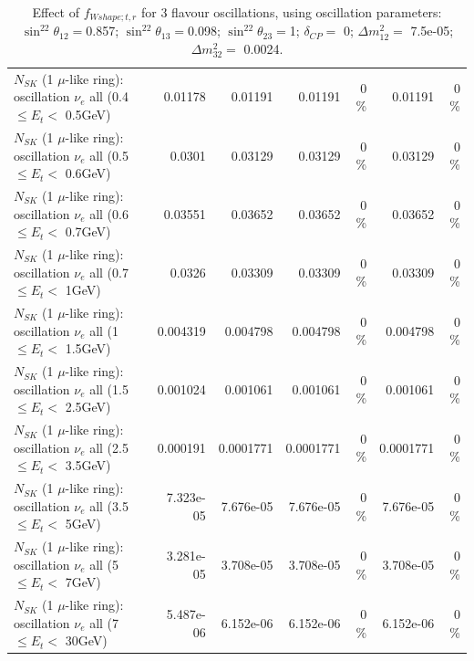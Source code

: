 \begin{table}
\begin{tabular}{| l | r | r | r  r | r  r |}
$N_{SK}$ (1 $\mu$-like ring): oscillation $\nu_{e}$ all (0.4 $\leq E_{t} <$ 0.5GeV) &         0.01178 &         0.01191 &         0.01191 &        0 \%  &         0.01191 &        0 \%  \\ 
$N_{SK}$ (1 $\mu$-like ring): oscillation $\nu_{e}$ all (0.5 $\leq E_{t} <$ 0.6GeV) &          0.0301 &         0.03129 &         0.03129 &        0 \%  &         0.03129 &        0 \%  \\ 
$N_{SK}$ (1 $\mu$-like ring): oscillation $\nu_{e}$ all (0.6 $\leq E_{t} <$ 0.7GeV) &         0.03551 &         0.03652 &         0.03652 &        0 \%  &         0.03652 &        0 \%  \\ 
$N_{SK}$ (1 $\mu$-like ring): oscillation $\nu_{e}$ all (0.7 $\leq E_{t} <$ 1GeV) &          0.0326 &         0.03309 &         0.03309 &        0 \%  &         0.03309 &        0 \%  \\ 
$N_{SK}$ (1 $\mu$-like ring): oscillation $\nu_{e}$ all (1 $\leq E_{t} <$ 1.5GeV) &        0.004319 &        0.004798 &        0.004798 &        0 \%  &        0.004798 &        0 \%  \\ 
$N_{SK}$ (1 $\mu$-like ring): oscillation $\nu_{e}$ all (1.5 $\leq E_{t} <$ 2.5GeV) &        0.001024 &        0.001061 &        0.001061 &        0 \%  &        0.001061 &        0 \%  \\ 
$N_{SK}$ (1 $\mu$-like ring): oscillation $\nu_{e}$ all (2.5 $\leq E_{t} <$ 3.5GeV) &        0.000191 &       0.0001771 &       0.0001771 &        0 \%  &       0.0001771 &        0 \%  \\ 
$N_{SK}$ (1 $\mu$-like ring): oscillation $\nu_{e}$ all (3.5 $\leq E_{t} <$ 5GeV) &       7.323e-05 &       7.676e-05 &       7.676e-05 &        0 \%  &       7.676e-05 &        0 \%  \\ 
 $N_{SK}$ (1 $\mu$-like ring): oscillation $\nu_{e}$ all (5 $\leq E_{t} <$ 7GeV) &       3.281e-05 &       3.708e-05 &       3.708e-05 &        0 \%  &       3.708e-05 &        0 \%  \\ 
$N_{SK}$ (1 $\mu$-like ring): oscillation $\nu_{e}$ all (7 $\leq E_{t} <$ 30GeV) &       5.487e-06 &       6.152e-06 &       6.152e-06 &        0 \%  &       6.152e-06 &        0 \%  \\ 
\hline
\hline
\end{tabular}
\caption{ Effect of $f_{Wshape; t, r}$ for 3 flavour oscillations, using oscillation parameters:  $\sin^22\theta_{12} = $0.857; $\sin^22\theta_{13} = $0.098; $\sin^22\theta_{23} = $1; $\delta_{CP} = $        0; $\Delta m^2_{12} = $    7.5e-05; $\Delta m^2_{32} = $    0.0024. }
\label{tab:num_xsec_wshape_1RmuT_3f_osc_t13:0.098}
\end{table}
